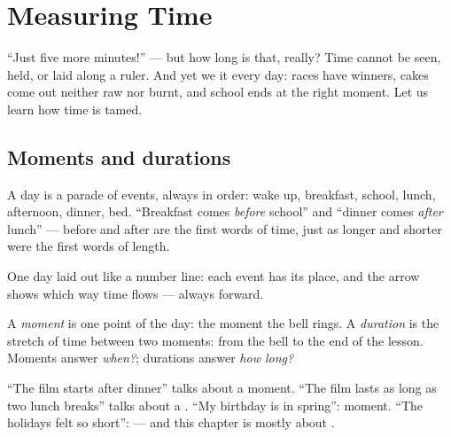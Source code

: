 \chapter{Measuring Time}\label{ch:g2:measuring-time}

``Just five more minutes!'' --- but how long is that, really? Time
cannot be seen, held, or laid along a ruler. And yet we  it
every day: races have winners, cakes come out neither raw nor burnt,
and school ends at the right moment. Let us learn how time is tamed.

\section{Moments and durations}

\begin{example}\label{ex:g2:measuring-time:order}
A day is a parade of events, always in order: wake up, breakfast,
school, lunch, afternoon, dinner, bed. ``Breakfast comes
\emph{before} school'' and ``dinner comes \emph{after} lunch'' ---
before and after are the first words of time, just as longer and
shorter were the first words of length.
\end{example}

\begin{omfigure}

{\small One day laid out like a number line: each event has its
place, and the arrow shows which way time flows --- always forward.}
\end{omfigure}

\begin{definition}[Duration]\label{def:g2:measuring-time:duration}
A \emph{moment} is one point of the day: the moment the
bell rings. A \emph{duration} is the stretch of time
between two moments: from the bell to the end of the lesson. Moments
answer \emph{when?}; durations answer \emph{how long?}
\end{definition}

\begin{example}\label{ex:g2:measuring-time:whenhowlong}
``The film starts after dinner'' talks about a moment. ``The film
lasts as long as two lunch breaks'' talks about a . ``My
birthday is in spring'': moment. ``The holidays felt so short'':
 --- and this chapter is mostly about .
\end{example}

